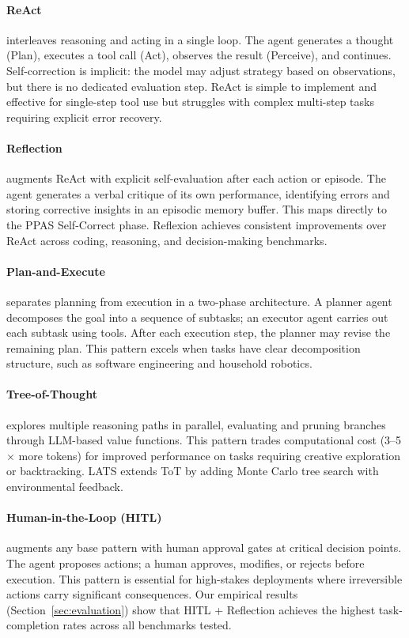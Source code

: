 \documentclass[review]{elsarticle}
\theoremstyle{definition}
\begin{document}
\paragraph{ReAct} \citep{yao2023react} interleaves reasoning and acting in a single loop. The agent generates a thought (Plan), executes a tool call (Act), observes the result (Perceive), and continues. Self-correction is implicit: the model may adjust strategy based on observations, but there is no dedicated evaluation step. ReAct is simple to implement and effective for single-step tool use but struggles with complex multi-step tasks requiring explicit error recovery.

\paragraph{Reflection} \citep{shinn2023reflexion} augments ReAct with explicit self-evaluation after each action or episode. The agent generates a verbal critique of its own performance, identifying errors and storing corrective insights in an episodic memory buffer. This maps directly to the PPAS Self-Correct phase. Reflexion achieves consistent improvements over ReAct across coding, reasoning, and decision-making benchmarks.

\paragraph{Plan-and-Execute} separates planning from execution in a two-phase architecture. A planner agent decomposes the goal into a sequence of subtasks; an executor agent carries out each subtask using tools. After each execution step, the planner may revise the remaining plan. This pattern excels when tasks have clear decomposition structure, such as software engineering \citep{cognition2024devin} and household robotics.

\paragraph{Tree-of-Thought} \citep{yao2024tree} explores multiple reasoning paths in parallel, evaluating and pruning branches through LLM-based value functions. This pattern trades computational cost (3--5$\times$ more tokens) for improved performance on tasks requiring creative exploration or backtracking. LATS \citep{zhou2024language} extends ToT by adding Monte Carlo tree search with environmental feedback.

\paragraph{Human-in-the-Loop (HITL)} augments any base pattern with human approval gates at critical decision points. The agent proposes actions; a human approves, modifies, or rejects before execution. This pattern is essential for high-stakes deployments where irreversible actions carry significant consequences. Our empirical results (Section~\ref{sec:evaluation}) show that HITL + Reflection achieves the highest task-completion rates across all benchmarks tested.
\end{document}
